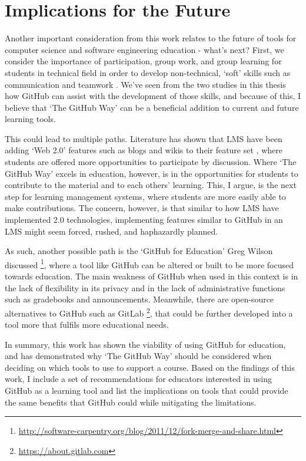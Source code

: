 \section{Implications for the Future}
Another important consideration from this work relates to the future of tools for computer science and software engineering education - what's next? First, we consider the importance of participation, group work, and group learning for students in technical field in order to develop non-technical, `soft' skills such as communication and teamwork \cite{jazayeri2004education}. We've seen from the two studies in this thesis how GitHub can assist with the development of those skills, and because of this, I believe that `The GitHub Way' can be a beneficial addition to current and future learning tools.

This could lead to multiple paths. Literature has shown that LMS have been adding `Web 2.0' features such as blogs and wikis to their feature set \cite{downes2005feature}, where students are offered more opportunities to participate by discussion. Where `The GitHub Way' excels in education, however, is in the opportunities for students to contribute to the material and to each others' learning. This, I argue, is the next step for learning management systems, where students are more easily able to make contributions. The concern, however, is that similar to how LMS have implemented 2.0 technologies, implementing features similar to GitHub in an LMS might seem forced, rushed, and haphazardly planned.

As such, another possible path is the `GitHub for Education' Greg Wilson discussed \footnote{\url{http://software-carpentry.org/blog/2011/12/fork-merge-and-share.html}}, where a tool like GitHub can be altered or built to be more focused towards education. The main weakness of GitHub when used in this context is in the lack of flexibility in its privacy and in the lack of administrative functions such as gradebooks and announcements. Meanwhile, there are open-source alternatives to GitHub such as GitLab \footnote{\url{https://about.gitlab.com}}, that could be further developed into a tool more that fulfils more educational needs.

In summary, this work has shown the viability of using GitHub for education, and has demonstrated why `The GitHub Way' should be considered when deciding on which tools to use to support a course. Based on the findings of this work, I include a set of recommendations for educators interested in using GitHub as a learning tool and list the implications on tools that could provide the same benefits that GitHub could while mitigating the limitations.


